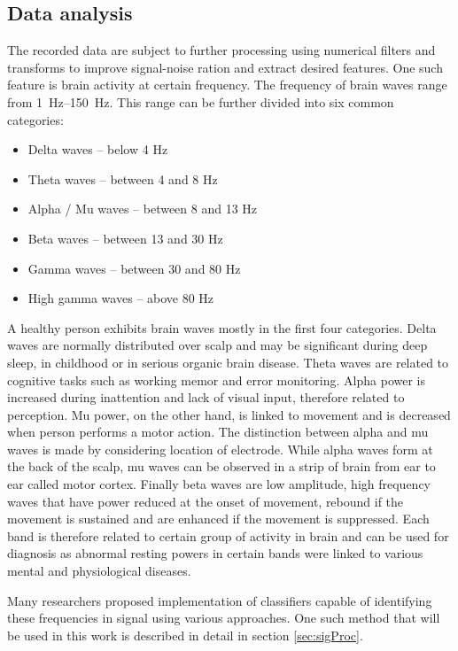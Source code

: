 \subsection{Data analysis}
\label{sub:dataAnalysis}
The recorded data are subject to further processing using numerical filters and
transforms to improve signal-noise ration and extract desired features. 
One such feature is brain activity at certain frequency. The frequency of brain
waves range from \SIrange{1}{150}{\Hz}. This range can be further divided
into six common categories\cite{dominantF}:
\begin{itemize}
  \item Delta waves -- below 4 Hz
  \item Theta waves -- between 4 and 8 Hz
  \item Alpha / Mu waves -- between 8 and 13 Hz
  \item Beta waves -- between 13 and 30 Hz
  \item Gamma waves -- between 30 and 80 Hz
  \item High gamma waves -- above 80 Hz
\end{itemize}
A healthy person exhibits brain waves mostly in the first four categories. Delta
waves are normally distributed over scalp and may be significant during deep
sleep, in childhood or in serious organic brain disease.\cite{eegClass} Theta
waves are related to cognitive tasks such as working memor and error monitoring.
Alpha power is increased during inattention and lack of visual input, therefore
related to perception. Mu power, on the other hand, is linked to movement and is
decreased when person performs a motor action. The distinction between alpha and
mu waves is made by considering location of electrode. While alpha waves form at
the back of the scalp, mu waves can be observed in a strip of brain from ear to
ear called motor cortex. Finally beta waves are low amplitude, high frequency
waves that have power reduced at the onset of movement, rebound if the movement
is sustained and are enhanced if the movement is suppressed. Each band is
therefore related to certain group of activity in brain and can be used for
diagnosis as abnormal resting powers in certain bands were linked to various
mental and physiological diseases.\cite{dominantF}

Many researchers proposed implementation of classifiers capable of identifying
these frequencies in signal using various approaches. One such method that will
be used in this work is described in detail in section \ref{sec:sigProc}.

